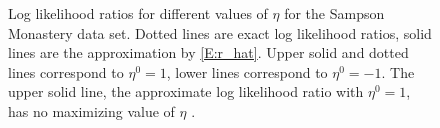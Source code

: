 \begin{figure} 
\begin{center} 
\end{center} 
\caption{Log likelihood ratios for different values of $\eta$ for the Sampson Monastery data set.  Dotted lines are exact log likelihood ratios, solid lines are the approximation by \eqref{E:r_hat}.  Upper solid and dotted lines correspond to $\eta^0 = 1$, lower lines correspond to $\eta^0 = -1$.  The upper solid line, the approximate log likelihood ratio with $\eta^0 = 1$, has no maximizing value of $\eta$ \citep{ergm}.} 
\end{figure} 

